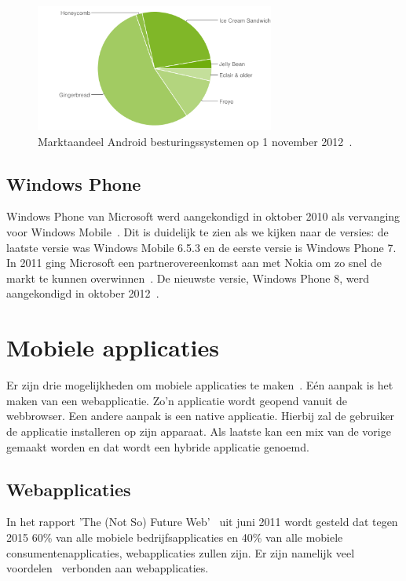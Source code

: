 \begin{figure}
  \centering
  \includegraphics[width=0.7\textwidth]{figuren/marketshare-android-2012-11-01.png}
  \caption{Marktaandeel Android besturingssystemen op 1 november 2012~\cite{Android2012}.}
  \label{fig:marketshare-android}
\end{figure}

\subsection{Windows Phone}
Windows Phone van Microsoft werd aangekondigd in oktober 2010 als vervanging voor Windows Mobile~\cite{Seitz2010,Lieberman2010}. Dit is duidelijk te zien als we kijken naar de versies: de laatste versie was Windows Mobile 6.5.3 en de eerste versie is Windows Phone 7. In 2011 ging Microsoft een partnerovereenkomst aan met Nokia om zo snel de markt te kunnen overwinnen~\cite{Microsoft2011}. De nieuwste versie, Windows Phone 8, werd aangekondigd in oktober 2012~\cite{Reed2012}. 


\section{Mobiele applicaties}
\label{sec:mobiele-applicaties}
Er zijn drie mogelijkheden om mobiele applicaties te maken~\cite{Accenture2012,Hales2012}. Eén aanpak is het maken van een webapplicatie. Zo'n applicatie wordt geopend vanuit de webbrowser. Een andere aanpak is een native applicatie. Hierbij zal de gebruiker de applicatie installeren op zijn apparaat. Als laatste kan een mix van de vorige gemaakt worden en dat wordt een hybride applicatie genoemd.

\subsection{Webapplicaties}
In het rapport 'The (Not So) Future Web'~\cite{Phifer2011} uit juni 2011 wordt gesteld dat tegen 2015 60\% van alle mobiele bedrijfsapplicaties en 40\% van alle mobiele consumentenapplicaties, webapplicaties zullen zijn. Er zijn namelijk veel voordelen~\cite{Accenture2012} verbonden aan webapplicaties.

